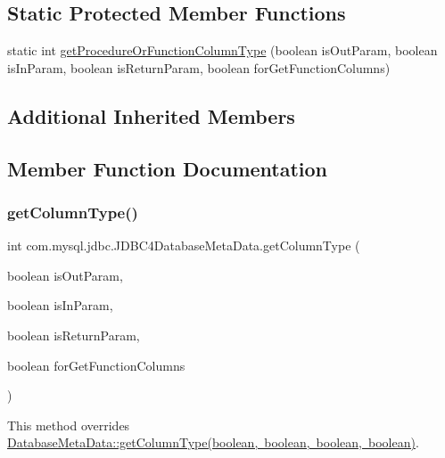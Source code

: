 \subsection*{Static Protected Member Functions}
\begin{DoxyCompactItemize}
\item 
static int \mbox{\hyperlink{classcom_1_1mysql_1_1jdbc_1_1_j_d_b_c4_database_meta_data_a2792991e9a30eabf05de200840c80a42}{get\+Procedure\+Or\+Function\+Column\+Type}} (boolean is\+Out\+Param, boolean is\+In\+Param, boolean is\+Return\+Param, boolean for\+Get\+Function\+Columns)
\end{DoxyCompactItemize}
\subsection*{Additional Inherited Members}


\subsection{Member Function Documentation}
\mbox{\label{classcom_1_1mysql_1_1jdbc_1_1_j_d_b_c4_database_meta_data_a155ed928ee6454172e7e9eac80d923aa}} 
\subsubsection{\texorpdfstring{get\+Column\+Type()}{getColumnType()}}
{\footnotesize\ttfamily int com.\+mysql.\+jdbc.\+J\+D\+B\+C4\+Database\+Meta\+Data.\+get\+Column\+Type (\begin{DoxyParamCaption}\item[{boolean}]{is\+Out\+Param,  }\item[{boolean}]{is\+In\+Param,  }\item[{boolean}]{is\+Return\+Param,  }\item[{boolean}]{for\+Get\+Function\+Columns }\end{DoxyParamCaption})\hspace{0.3cm}{\ttfamily [protected]}}

This method overrides \mbox{\hyperlink{classcom_1_1mysql_1_1jdbc_1_1_database_meta_data_a8db5167e582f242a48275aaffc5aa04a}{Database\+Meta\+Data\+::get\+Column\+Type(boolean, boolean, boolean, boolean)}}.

